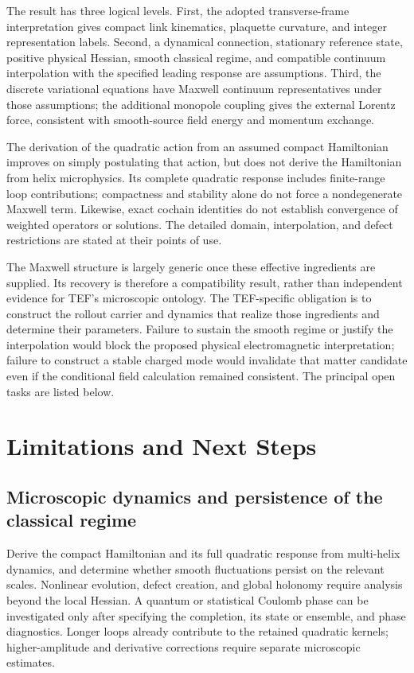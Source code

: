 \documentclass[11pt]{article}
\begin{document}
The result has three logical levels. First, the adopted transverse-frame interpretation gives compact link kinematics, plaquette curvature, and integer representation labels. Second, a dynamical connection, stationary reference state, positive physical Hessian, smooth classical regime, and compatible continuum interpolation with the specified leading response are assumptions. Third, the discrete variational equations have Maxwell continuum representatives under those assumptions; the additional monopole coupling gives the external Lorentz force, consistent with smooth-source field energy and momentum exchange.

The derivation of the quadratic action from an assumed compact Hamiltonian improves on simply postulating that action, but does not derive the Hamiltonian from helix microphysics. Its complete quadratic response includes finite-range loop contributions; compactness and stability alone do not force a nondegenerate Maxwell term. Likewise, exact cochain identities do not establish convergence of weighted operators or solutions. The detailed domain, interpolation, and defect restrictions are stated at their points of use.

The Maxwell structure is largely generic once these effective ingredients are supplied. Its recovery is therefore a compatibility result, rather than independent evidence for TEF's microscopic ontology. The TEF-specific obligation is to construct the rollout carrier and dynamics that realize those ingredients and determine their parameters. Failure to sustain the smooth regime or justify the interpolation would block the proposed physical electromagnetic interpretation; failure to construct a stable charged mode would invalidate that matter candidate even if the conditional field calculation remained consistent. The principal open tasks are listed below.

\section{Limitations and Next Steps}

\subsection{Microscopic dynamics and persistence of the classical regime}

Derive the compact Hamiltonian and its full quadratic response from multi-helix dynamics, and determine whether smooth fluctuations persist on the relevant scales. Nonlinear evolution, defect creation, and global holonomy require analysis beyond the local Hessian. A quantum or statistical Coulomb phase can be investigated only after specifying the completion, its state or ensemble, and phase diagnostics. Longer loops already contribute to the retained quadratic kernels; higher-amplitude and derivative corrections require separate microscopic estimates.
\end{document}
